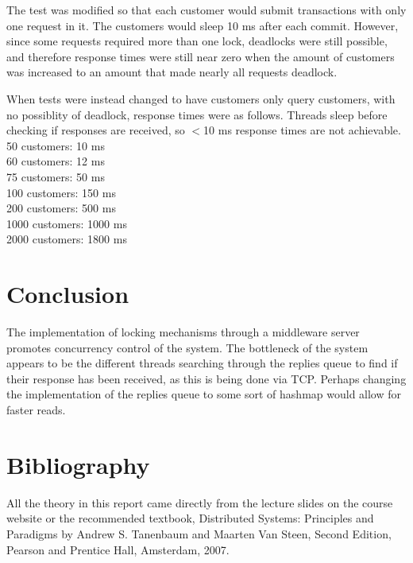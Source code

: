 \documentclass[letterpaper,12pt]{article}
\begin{document}
The test was modified so that each customer would submit transactions with only one request in it. The customers would sleep 10 ms after each commit. However, since some requests required more than one lock, deadlocks were still possible, and therefore response times were still near zero when the amount of customers was increased to an amount that made nearly all requests deadlock. 

When tests were instead changed to have customers only query customers, with no possiblity of deadlock, response times were as follows.
Threads sleep before checking if responses are received, so $<$10 ms response times are not achievable.\\

50 customers: 10 ms\\
60 customers: 12 ms\\
75 customers: 50 ms\\
100 customers: 150 ms\\
200 customers: 500 ms\\
1000 customers: 1000 ms\\
2000 customers: 1800 ms


\section{Conclusion}

The implementation of locking mechanisms through a middleware server promotes concurrency control of the system. The bottleneck of the system appears to be the different threads searching through the replies queue to find if their response has been received, as this is being done via TCP. Perhaps changing the implementation of the replies queue to some sort of hashmap would allow for faster reads. 

\section{Bibliography}

All the theory in this report came directly from the lecture slides on the course website or the recommended textbook, Distributed Systems: Principles and Paradigms by Andrew S. Tanenbaum and Maarten Van Steen, Second Edition, Pearson and Prentice Hall, Amsterdam, 2007. 
\end{document}
